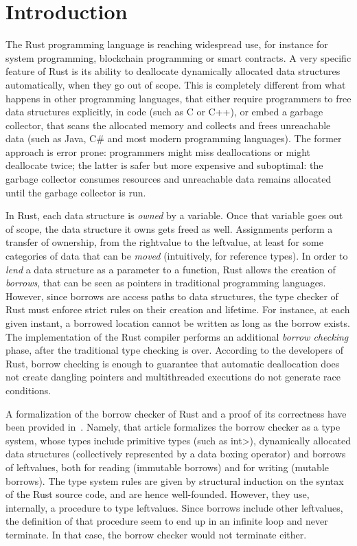 \section{Introduction}\label{sec:introduction}

The Rust programming language is reaching widespread use,
for instance for system programming,
blockchain programming or smart contracts.
A very specific feature of Rust is its ability to deallocate dynamically allocated
data structures automatically, when they go out of scope. This is completely different
from what happens in other programming languages, that either require programmers to free data structures
explicitly, in code (such as C or C++), or embed a garbage collector, that scans the allocated memory
and collects and frees unreachable data (such as Java, C\# and most modern programming languages).
The former approach is error prone: programmers might miss deallocations or might deallocate twice;
the latter is safer but more expensive and suboptimal:
the garbage collector consumes resources and unreachable data remains
allocated until the garbage collector is run.

In Rust, each data structure is \emph{owned} by a variable. Once that variable goes
out of scope, the data structure it owns gets freed as well. Assignments perform
a transfer of ownership, from the rightvalue to the leftvalue, at least for some
categories of data that can be \emph{moved} (intuitively, for reference types).
In order to \emph{lend} a data structure as a parameter to a function, Rust allows the
creation of \emph{borrows}, that can be seen as pointers in traditional programming languages.
However, since borrows are access paths to data structures, the type checker of Rust
must enforce strict rules on their creation and lifetime. For instance, at each given
instant, a borrowed location cannot be written as long as the borrow exists.
The implementation of the Rust compiler performs an additional \emph{borrow checking} phase,
after the traditional type checking is over.
According to the developers of Rust, borrow checking is enough to guarantee that
automatic deallocation does not create dangling pointers and multithreaded
executions do not generate race conditions.

A formalization of the borrow checker of Rust and a proof of its correctness have been provided in~\cite{Pearce21}.
Namely, that article formalizes the borrow checker as a type system, whose
types include primitive types (such as \<int>), dynamically allocated data structures
(collectively represented by a data boxing operator) and borrows of leftvalues,
both for reading (immutable borrows)
and for writing (mutable borrows). The type system rules are given by structural induction
on the syntax of the Rust source code, and are hence well-founded. However, they use, internally,
a procedure to type leftvalues. Since borrows include other leftvalues,
the definition of that procedure seem to end up in an infinite loop and never terminate.
In that case, the borrow checker would not terminate either.

